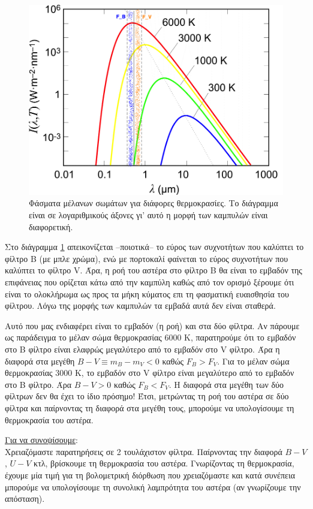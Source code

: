 \begin{figure}[h]
    \centering
    \includegraphics[scale=0.3]{Figures/Planck_law_log_log_scale.png}
    \caption{Φάσματα μέλανων σωμάτων για διάφορες θερμοκρασίες. Το διάγραμμα είναι σε λογαριθμικούς άξονες γι' αυτό η μορφή των καμπυλών είναι διαφορετική.}
    \label{fig:planck_law_log_scale}
\end{figure}

Στο διάγραμμα \ref{fig:planck_law_log_scale} απεικονίζεται --ποιοτικά-- το εύρος των συχνοτήτων που καλύπτει το φίλτρο B (με μπλε χρώμα), ενώ με πορτοκαλί φαίνεται το εύρος συχνοτήτων που καλύπτει το φίλτρο V. Άρα, η ροή του αστέρα στο φίλτρο B θα είναι το εμβαδόν της επιφάνειας που ορίζεται κάτω από την καμπύλη καθώς από τον ορισμό ξέρουμε ότι είναι το ολοκλήρωμα ως προς τα μήκη κύματος επι τη φασματική ευαισθησία του φίλτρου. Λόγω της μορφής των καμπυλών τα εμβαδά αυτά δεν είναι σταθερά.

Αυτό που μας ενδιαφέρει είναι το εμβαδόν (η ροή) και στα δύο φίλτρα. Αν πάρουμε ως παράδειγμα το μέλαν σώμα θερμοκρασίας 6000 Κ, παρατηρούμε ότι το εμβαδόν στο B φίλτρο είναι ελαφρώς μεγαλύτερο από το εμβαδόν στο V φίλτρο. Άρα η διαφορά στα μεγέθη $B - V \equiv m_B - m_V < 0$ καθώς $F_B > F_V$.
Για το μέλαν σώμα θερμοκρασίας 3000 Κ, το εμβαδόν στο V φίλτρο είναι μεγαλύτερο από το εμβαδόν στο B φίλτρο. Άρα $B - V > 0$ καθώς $F_B < F_V$.
Η διαφορά στα μεγέθη των δύο φίλτρων δεν θα έχει το ίδιο πρόσημο! Έτσι, μετρώντας τη ροή του αστέρα σε δύο φίλτρα και παίρνοντας τη διαφορά στα μεγέθη τους, μπορούμε να υπολογίσουμε τη θερμοκρασία του αστέρα.

\underline{Για να συνοψίσουμε}:\\
Χρειαζόμαστε παρατηρήσεις σε 2 τουλάχιστον φίλτρα. Παίρνοντας την διαφορά $B - V$, $U - V$ κτλ, βρίσκουμε τη θερμοκρασία του αστέρα. Γνωρίζοντας τη θερμοκρασία, έχουμε μία τιμή για τη βολομετρική διόρθωση που χρειαζόμαστε και κατά συνέπεια μπορούμε να υπολογίσουμε τη συνολική λαμπρότητα του αστέρα (αν γνωρίζουμε την απόσταση).

